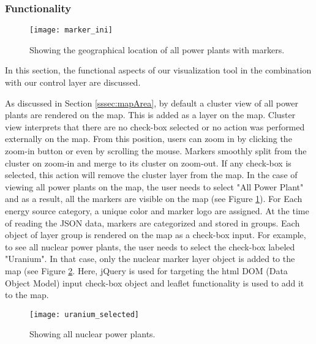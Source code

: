 \subsubsection{Functionality}
\label{sssec:functionality}

\begin{figure} [H]
  \begin{center}
    \texttt{[image: marker\_ini]}
    \caption{Showing the geographical location of all power plants with markers.}
    \label{fig:markerini}
  \end{center}
\end{figure}

In this section, the functional aspects of our visualization tool in the combination with our control layer are discussed.

As discussed in Section \ref{sssec:mapArea}, by default a cluster view of all power plants are rendered on the map. This is added as a layer on the map. Cluster view interprets that there are no check-box selected or no action was performed externally on the map. From this position, users can zoom in by clicking the zoom-in button or even by scrolling the mouse. Markers smoothly split from the cluster on zoom-in and merge to its cluster on zoom-out. If any check-box is selected, this action will remove the cluster layer from the map. In the case of viewing all power plants on the map, the user needs to select "All Power Plant" and as a result, all the markers are visible on the map (see Figure \ref{fig:markerini}). For Each energy source category, a unique color and marker logo are assigned. At the time of reading the JSON data, markers are categorized and stored in groups. Each object of layer group is rendered on the map as a check-box input. For example,  to see all nuclear power plants, the user needs to select the check-box labeled "Uranium". In that case, only the nuclear marker layer object is added to the map (see Figure \ref{fig:uranium}. Here, jQuery is used for targeting the html DOM (Data Object Model) input check-box object and leaflet functionality is used to add it to the map. 

\begin{figure}
  \begin{center}
    \texttt{[image: uranium\_selected]}
    \caption{Showing all nuclear power plants.}
    \label{fig:uranium}
  \end{center}
\end{figure}

